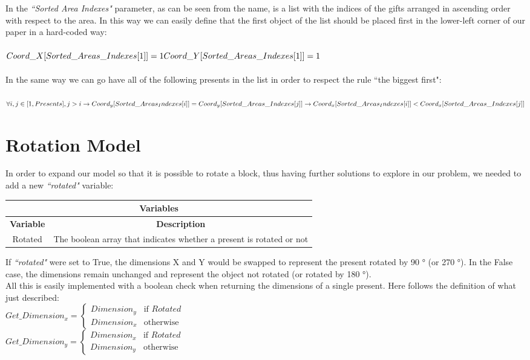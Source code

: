 In the \textit{``Sorted Area Indexes"} parameter, as can be seen from the name, is a list with the indices of the gifts arranged in ascending order with respect to the area.
In this way we can easily define that the first object of the list should be placed first in the lower-left corner of our paper in a hard-coded way:\\ \\
$
Coord\_X[Sorted\_Areas\_Indexes[1]] = 1\\
Coord\_Y[Sorted\_Areas\_Indexes[1]] = 1
$
\\ \\
In the same way we can go have all of the following presents in the list in order to respect the rule ``the biggest first":\\ \\
$
\forall i, j \in [1, Presents], j > i \rightarrow \\
Coord_y[Sorted\_Areas_Indexes[i]] = Coord_y[Sorted\_Areas\_Indexes[j]] \rightarrow \\
Coord_x[Sorted\_Areas_Indexes[i]] < Coord_x[Sorted\_Areas\_Indexes[j]]
$
\\




\section{Rotation Model}
In order to expand our model so that it is possible to rotate a block, thus having further solutions to explore in our problem, we needed to add a new \textit{``rotated"} variable:
\begin{center}
		\begin{tabular}{|c|c|}
			\hline
			\multicolumn{2}{|c|}{\textbf{Variables}} \\
			\hline
			\textbf{Variable} & {\textbf{Description}} \\
			\hline
			Rotated & The boolean array that indicates whether a present is rotated or not \\
			\hline
		\end{tabular}
\end{center}
If \textit{``rotated"} were set to True, the dimensions X and Y would be swapped to represent the present rotated by 90 ° (or 270 °). In the False case, the dimensions remain unchanged and represent the object not rotated (or rotated by 180 °). \\
All this is easily implemented with a boolean check when returning the dimensions of a single present.
Here follows the definition of what just described:\\
$
Get\_Dimension_x = 
\begin{cases}
	Dimension_y & \text{if } Rotated \\
	Dimension_x & \text{otherwise}
\end{cases}
$
\\
$
Get\_Dimension_y = 
\begin{cases}
	Dimension_x & \text{if } Rotated \\
	Dimension_y & \text{otherwise}
\end{cases}
$

